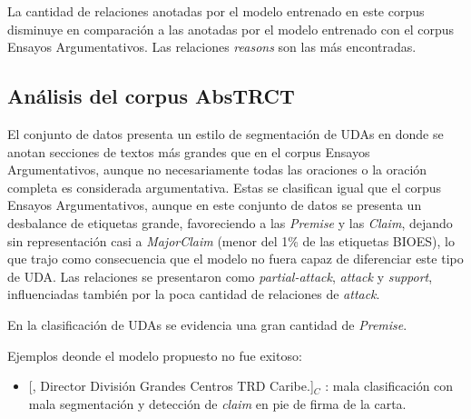 \documentclass[a4paper,11pt,twocolumn,twoside]{article}
\begin{document}
La cantidad de relaciones anotadas por el modelo entrenado en este corpus
disminuye en comparación a las anotadas por el modelo entrenado con el corpus Ensayos
Argumentativos. Las relaciones \textit{reasons} son las más encontradas. %


\subsection{Análisis del corpus AbsTRCT}


El conjunto de datos presenta un estilo de segmentación de UDAs en donde se anotan 
secciones de textos más grandes que en el corpus Ensayos Argumentativos, aunque no necesariamente 
todas las oraciones o la oración completa es considerada argumentativa. 
Estas se clasifican igual que el corpus Ensayos Argumentativos, aunque 
en este conjunto de datos se presenta un desbalance de etiquetas grande, favoreciendo 
a las \textit{Premise} y las \textit{Claim}, %
dejando sin representación casi a \textit{MajorClaim}
(menor del 1\% de las etiquetas BIOES), lo que trajo como consecuencia que el modelo no fuera 
capaz de diferenciar este tipo de UDA. Las relaciones se presentaron como \textit{partial-attack},
\textit{attack} y \textit{support}, influenciadas también por la poca cantidad de relaciones de \textit{attack}.

En la clasificación de UDAs se evidencia una gran cantidad de \textit{Premise}.

Ejemplos deonde el modelo propuesto no fue exitoso:
\begin{itemize}
	\item \text{} [, Director División Grandes Centros TRD Caribe.]$_C$
	      : mala clasificación con mala segmentación y detección de \textit{claim} en pie de firma de la carta. 
\end{itemize}
\end{document}
